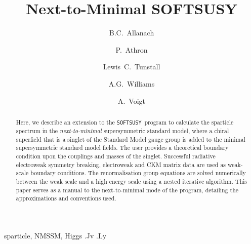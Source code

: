 \documentclass[final,3p,times,pdflatex]{elsarticle}
\begin{document}
\begin{frontmatter}

\title{Next-to-Minimal SOFTSUSY}

\author{B.C.~Allanach}
\address{DAMTP, CMS, University of Cambridge, Wilberforce road, Cambridge, CB3
  0WA, United Kingdom}

\author{P.~Athron}
\author{Lewis~C.~Tunstall}
\author{A.G.~Williams}
\address{ARC Centre of Excellence for Particle Physics at 
the Tera-scale, School of Chemistry and Physics, University of Adelaide, 
Adelaide SA 5005 Australia}

\author{A.~Voigt}
\address{Institut f\"ur Kern- und Teilchenphysik,
TU Dresden, Zellescher Weg 19, 01069 Dresden, Germany}
\begin{abstract}
  Here, we describe an extension to the
  {\tt SOFTSUSY}~program to calculate the sparticle spectrum in the
  {\em next-to-minimal} supersymmetric standard model, where a chiral
  superfield that is a singlet of the Standard Model gauge group is added to
  the minimal supersymmetric standard model fields. 
  The user provides a theoretical boundary condition upon the couplings and
  masses of the singlet.
  Successful radiative electroweak symmetry breaking,
  electroweak and CKM matrix data are used
  as weak-scale boundary conditions. 
  The renormalisation group equations are solved
  numerically between the weak scale and a high energy scale using a nested
  iterative algorithm. 
  This paper serves as a manual to the
  next-to-minimal mode of the program, detailing the approximations and
  conventions used. 
\end{abstract}

\begin{keyword}
sparticle, 
NMSSM, Higgs
.Jv
.Ly
\end{keyword}
\end{frontmatter}
\end{document}
